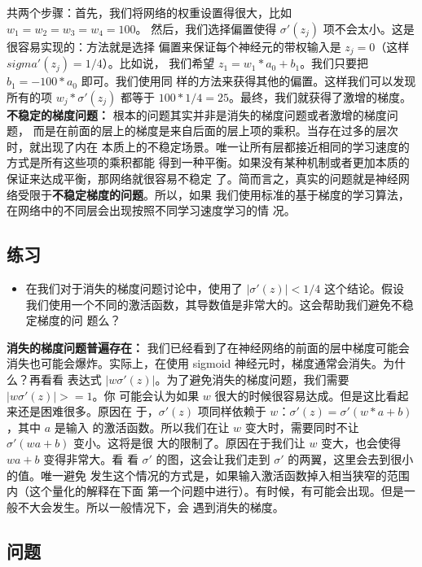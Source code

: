 共两个步骤：首先，我们将网络的权重设置得很大，比如 $w_1 = w_2 = w_3 = w_4 = 100$。
然后，我们选择偏置使得 $\sigma'(z_j)$ 项不会太小。这是很容易实现的：方法就是选择
偏置来保证每个神经元的带权输入是 $z_j = 0$（这样 $sigma'(z_j) = 1/4$）。比如说，
我们希望 $z_1 = w_1 * a_0 + b_1$。我们只要把 $b_1 = -100 * a_0$ 即可。我们使用同
样的方法来获得其他的偏置。这样我们可以发现所有的项 $w_j * \sigma'(z_j)$ 都等于
$100*1/4 = 25$。最终，我们就获得了激增的梯度。\\
 
\textbf{不稳定的梯度问题：} 根本的问题其实并非是消失的梯度问题或者激增的梯度问题，
而是在前面的层上的梯度是来自后面的层上项的乘积。当存在过多的层次时，就出现了内在
本质上的不稳定场景。唯一让所有层都接近相同的学习速度的方式是所有这些项的乘积都能
得到一种平衡。如果没有某种机制或者更加本质的保证来达成平衡，那网络就很容易不稳定
了。简而言之，真实的问题就是神经网络受限于\textbf{不稳定梯度的问题}。所以，如果
我们使用标准的基于梯度的学习算法，在网络中的不同层会出现按照不同学习速度学习的情
况。

\subsection*{练习}

\begin{itemize}
\item 在我们对于消失的梯度问题讨论中，使用了 $|\sigma'(z)| < 1/4$ 这个结论。假设
  我们使用一个不同的激活函数，其导数值是非常大的。这会帮助我们避免不稳定梯度的问
  题么？
\end{itemize}
 
\textbf{消失的梯度问题普遍存在：} 我们已经看到了在神经网络的前面的层中梯度可能会
消失也可能会爆炸。实际上，在使用 sigmoid 神经元时，梯度通常会消失。为什么？再看看
表达式 $|w\sigma'(z)|$。为了避免消失的梯度问题，我们需要 $|w\sigma'(z)| >= 1$。你
可能会认为如果 $w$ 很大的时候很容易达成。但是这比看起来还是困难很多。原因在
于，$\sigma'(z)$ 项同样依赖于 $w$：$\sigma'(z) = \sigma'(w*a+b)$，其中 $a$ 是输入
的激活函数。所以我们在让 $w$ 变大时，需要同时不让 $\sigma'(wa+b)$ 变小。这将是很
大的限制了。原因在于我们让 $w$ 变大，也会使得 $wa + b$ 变得非常大。看
看 $\sigma'$ 的图，这会让我们走到 $\sigma'$ 的两翼，这里会去到很小的值。唯一避免
发生这个情况的方式是，如果输入激活函数掉入相当狭窄的范围内（这个量化的解释在下面
第一个问题中进行）。有时候，有可能会出现。但是一般不大会发生。所以一般情况下，会
遇到消失的梯度。

\subsection*{问题}

